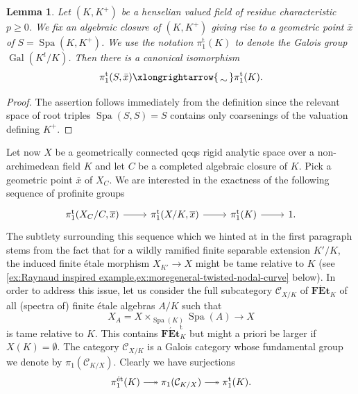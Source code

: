 \documentclass[a4paper,twoside,11pt,reqno]{amsart}
\newcommand{\cC}{{\mathcal C}}
\DeclareRobustCommand\longtwoheadrightarrow {\relbar\joinrel\twoheadrightarrow}
\newcommand{\surj}{\longtwoheadrightarrow}
\newcommand{\isomto}{\xlongrightarrow{\,\smash{\raisebox{-0.65ex} 
    {\ensuremath{\displaystyle\sim}}}\,}}
\newcommand{\la}{\longrightarrow}
\DeclareMathOperator{\Gal}{Gal}
\DeclareMathOperator{\Spa}{Spa}
\newcommand{\et}{\text{\rm \'et}}
\newcommand{\cat}[1]{\mathbf{#1}}
\newcommand{\FEt}{\cat{F\acute{E}t}}
\newcommand{\ov}[1]{\overline{#1}}
\newcommand{\pitame}{\pi_1^{\mathrm{t}}}
\newcommand{\FEtt}{{\cat{F\acute{E}t}}^{\!\mathrm{t}}}
\newtheorem{lem}[thm]{Lemma}
\theoremstyle{definition}
\numberwithin{equation}{subsection}
\begin{document}
\begin{lem} \label{lem:structure of pitame na field}
    Let $(K,K^+)$ be a henselian valued field of residue characteristic $p \ge 0$.
    We fix an algebraic closure of $(K,K^+)$ giving rise to a geometric point $\bar x$ of $S=\Spa(K,K^+)$.
    We use the notation $\pitame(K)$ to denote the Galois group $\Gal(K^t/K)$.
    Then there is a canonical isomorphism
        \[
        \pitame(S,\bar x) \isomto \pitame(K).
        \]
\end{lem}

\begin{proof}
    The assertion follows immediately from the definition since the relevant space of root triples $\Spa(S,S) = S$ contains only coarsenings of the valuation defining $K^+$. 
\end{proof}

Let now $X$ be a geometrically connected qcqs rigid analytic space over a non-archimedean field $K$ and let $C$ be a completed algebraic closure of $K$. Pick a geometric point $\ov x$ of $X_C$. We are interested in the exactness of the following sequence of profinite groups 
\begin{equation} \label{eqn:fundamental-ex-seq}
    \begin{tikzcd}
        \pitame(X_C/C, \ov x)\ar[r] & \pitame(X/K,\ov x) \ar[r] & \pitame(K)\ar[r] & 1.
    \end{tikzcd}
\end{equation}
The subtlety surrounding this sequence which we hinted at in the first paragraph stems from the fact that for a wildly ramified finite separable extension $K'/K$, the induced finite \'etale morphism $X_{K'}\to X$ might be tame relative to $K$ (see \cref{ex:Raynaud inspired example,ex:moregeneral-twisted-nodal-curve} below). 
In order to address this issue, let us consider the full subcategory $\cC_{X/K}$ of $\FEt_K$ of all (spectra of) finite \'etale algebras $A/K$ such that 
\[
    X_A = X \times_{\Spa(K)} \Spa(A)\la X
\]
is tame relative to $K$. This contains $\FEtt_{K}$ but might a priori be larger if $X(K)=\emptyset$. The category $\cC_{X/K}$ is a Galois category whose fundamental group we denote by $\pi_1(\cC_{K/X})$. Clearly we have surjections
\[
\pi_1^\et(K) \surj \pi_1(\cC_{K/X}) \surj \pitame(K).
\]
\end{document}
